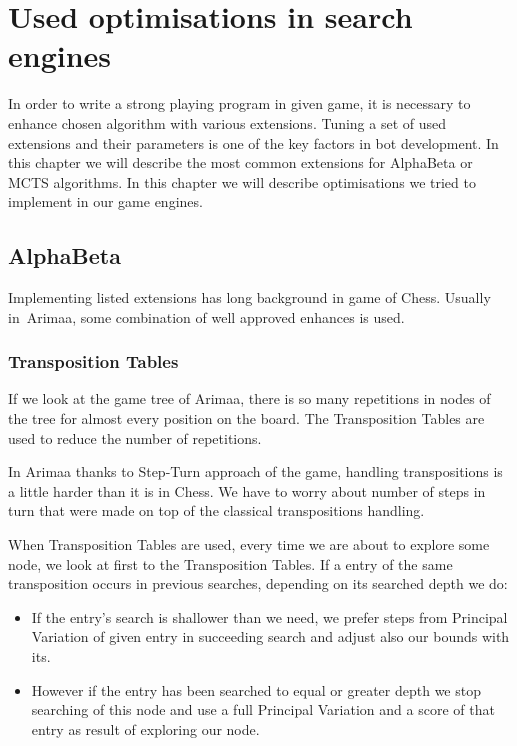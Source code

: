 \chapter{Used optimisations in search engines}

In order to write a strong playing program in given game, it is necessary to
enhance chosen algorithm with various extensions. Tuning a set of used
extensions and their parameters is one of the key factors in bot development.
In this chapter we will describe the most common extensions for AlphaBeta or
MCTS algorithms. In this chapter we will describe optimisations we tried to
implement in our game engines.

\section{AlphaBeta}
Implementing listed extensions has long background in game of Chess. Usually
in~Arimaa, some combination of well approved enhances is used.

\subsection{Transposition Tables}\label{AlphaBeta:TT}
If we look at the game tree of Arimaa, there is so many repetitions in nodes of
the tree for almost every position on the board. The Transposition Tables are
used to reduce the number of repetitions.

In Arimaa thanks to Step-Turn approach of the game, handling transpositions is
a little harder than it is in Chess. We have to worry about number of steps in
turn that were made on top of the classical transpositions handling.

When Transposition Tables are used, every time we are about to explore some
node, we look at first to the Transposition Tables. If a entry of the same
transposition occurs in previous searches, depending on its searched depth we
do:

\begin{itemize}
\item If the entry's search is shallower than we need, we prefer steps from
Principal Variation of given entry in succeeding search and adjust also our
bounds with its.
\item However if the entry has been searched to equal or greater depth we stop
searching of this node and use a full Principal Variation and a score of that
entry as result of exploring our node.
\end{itemize}

